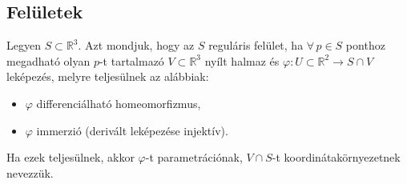 \documentclass[main.tex]{subfiles}
\begin{document}
\subsection{Felületek}


Legyen $S \subset  \mathbb{R}^3$. Azt mondjuk, hogy az $S$
reguláris felület, ha $\forall \, p \in S$ ponthoz megadható
olyan $p$-t tartalmazó $V \subset \mathbb{R}^3$ nyílt halmaz
és $\varphi: U \subset \mathbb{R}^2 \rightarrow S \cap V$
leképezés, melyre teljesülnek az alábbiak:
\begin{itemize}
  \item $\varphi$ differenciálható homeomorfizmus,

  \item $\varphi$ immerzió (derivált leképezése injektív).
\end{itemize}
Ha ezek teljesülnek, akkor $\varphi$-t parametrációnak,
$V \cap S$-t  koordinátakörnyezetnek nevezzük.
\end{document}
